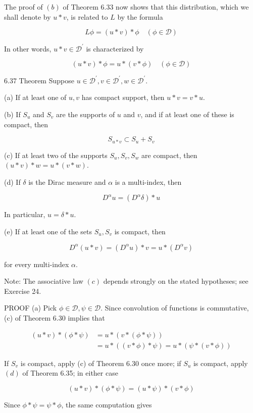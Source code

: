\documentclass[10pt]{article}
\begin{document}
The proof of $(b)$ of Theorem 6.33 now shows that this distribution, which we shall denote by $u * v$, is related to $L$ by the formula

$$
L \phi=(u * v) * \phi \quad(\phi \in \mathscr{D})
$$

In other words, $u * v \in \mathscr{D}^{\prime}$ is characterized by

$$
(u * v) * \phi=u *(v * \phi) \quad(\phi \in \mathscr{D})
$$

6.37 Theorem Suppose $u \in \mathscr{D}^{\prime}, v \in \mathscr{D}^{\prime}, w \in \mathscr{D}^{\prime}$.

(a) If at least one of $u, v$ has compact support, then $u * v=v * u$.

(b) If $S_{u}$ and $S_{v}$ are the supports of $u$ and $v$, and if at least one of these is compact, then

$$
S_{u * v} \subset S_{u}+S_{v}
$$

(c) If at least two of the supports $S_{u}, S_{v}, S_{w}$ are compact, then $(u * v) * w=u *(v * w)$.

(d) If $\delta$ is the Dirac measure and $\alpha$ is a multi-index, then

$$
D^{\alpha} u=\left(D^{\alpha} \delta\right) * u
$$

In particular, $u=\delta * u$.

(e) If at least one of the sets $S_{u}, S_{v}$ is compact, then

$$
D^{\alpha}(u * v)=\left(D^{\alpha} u\right) * v=u *\left(D^{\alpha} v\right)
$$

for every multi-index $\alpha$.

Note: The associative law $(c)$ depends strongly on the stated hypotheses; see Exercise 24.

PROOF (a) Pick $\phi \in \mathscr{D}, \psi \in \mathscr{D}$. Since convolution of functions is commutative, (c) of Theorem 6.30 implies that

$$
\begin{aligned}
(u * v) *(\phi * \psi) & =u *(v *(\phi * \psi)) \\
& =u *((v * \phi) * \psi)=u *(\psi *(v * \phi))
\end{aligned}
$$

If $S_{v}$ is compact, apply (c) of Theorem 6.30 once more; if $S_{u}$ is compact, apply $(d)$ of Theorem 6.35; in either case

$$
(u * v) *(\phi * \psi)=(u * \psi) *(v * \phi)
$$

Since $\phi * \psi=\psi * \phi$, the same computation gives
\end{document}
